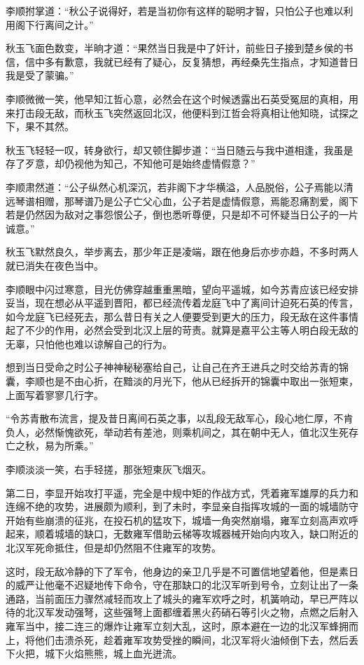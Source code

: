 李顺拊掌道：“秋公子说得好，若是当初你有这样的聪明才智，只怕公子也难以利用阁下行离间之计。”

秋玉飞面色数变，半晌才道：“果然当日我是中了奸计，前些日子接到楚乡侯的书信，信中多有歉意，我就已经有了疑心，反复猜想，再经桑先生指点，才知道昔日我是受了蒙骗。”

李顺微微一笑，他早知江哲心意，必然会在这个时候透露出石英受冤屈的真相，用来打击段无敌，而秋玉飞突然返回北汉，他便料到江哲会将真相让他知晓，试探之下，果不其然。

秋玉飞轻轻一叹，转身欲行，却又顿住脚步道：“当日随云与我中道相逢，我虽是存了歹意，却仍视他为知己，不知他可是始终虚情假意？”

李顺肃然道：“公子纵然心机深沉，若非阁下才华横溢，人品脱俗，公子焉能以清远琴谱相赠，那琴谱乃是公子亡父心血，公子若是虚情假意，焉能忍痛割爱，阁下若是仍然因为敌对之事怨恨公子，倒也悉听尊便，只是却不可怀疑当日公子的一片诚意。”

秋玉飞默然良久，举步离去，那少年正是凌端，跟在他身后亦步亦趋，不多时两人就已消失在夜色当中。

李顺眼中闪过寒意，目光仿佛穿越重重黑暗，望向平遥城，如今苏青应该已经安排妥当，现在想必从平遥到晋阳，都已经流传着龙庭飞中了离间计迫死石英的传言，如今龙庭飞已经死去，那么昔日有关之人便要受到更大的压力，段无敌在这件事情起了不少的作用，必然会受到北汉上层的苛责。就算是嘉平公主等人明白段无敌的无辜，只怕他也难以谅解自己的行为。

想到当日受命之时公子神神秘秘塞给自己，让自己在齐王进兵之时交给苏青的锦囊，李顺也是不由心折，在黯淡的月光下，他从已经拆开的锦囊中取出一张短柬，上面写着寥寥几行字。

“令苏青散布流言，提及昔日离间石英之事，以乱段无敌军心，段心地仁厚，不肯负人，必然惭愧欲死，举动若有差池，则乘机间之，其在朝中无人，值北汉生死存亡之秋，易为所乘。”

李顺淡淡一笑，右手轻搓，那张短柬灰飞烟灭。

第二日，李显开始攻打平遥，完全是中规中矩的作战方式，凭着雍军雄厚的兵力和连绵不绝的攻势，进展颇为顺利，到了未时，李显亲自指挥攻城的一面的城墙防守开始有些崩溃的征兆，在投石机的猛攻下，城墙一角突然崩塌，雍军立刻高声欢呼起来，顺着城墙的缺口，无数雍军借助云梯等攻城器械开始向内攻入，缺口附近的北汉军死命抵住，但是却仍然阻不住雍军的攻势。

这时，段无敌冷静的下了军令，他身边的亲卫几乎是不可置信地望着他，但是素日的威严让他毫不迟疑地传下命令，守在那缺口的北汉军听到号令，立刻让出了一条通路，当前面压力骤然减轻而攻上了城头的雍军欢呼之时，机簧响动，早已严阵以待的北汉军发动强弩，这些强弩上面都缠着黑火药硝石等引火之物，点燃之后射入雍军当中，接二连三的爆炸让雍军立刻大乱，这时，原本避在一边的北汉军蜂拥而上，将他们击溃杀死，趁着雍军攻势受挫的瞬间，北汉军将火油倾倒下去，然后丢下火把，城下火焰熊熊，城上血光迸流。

